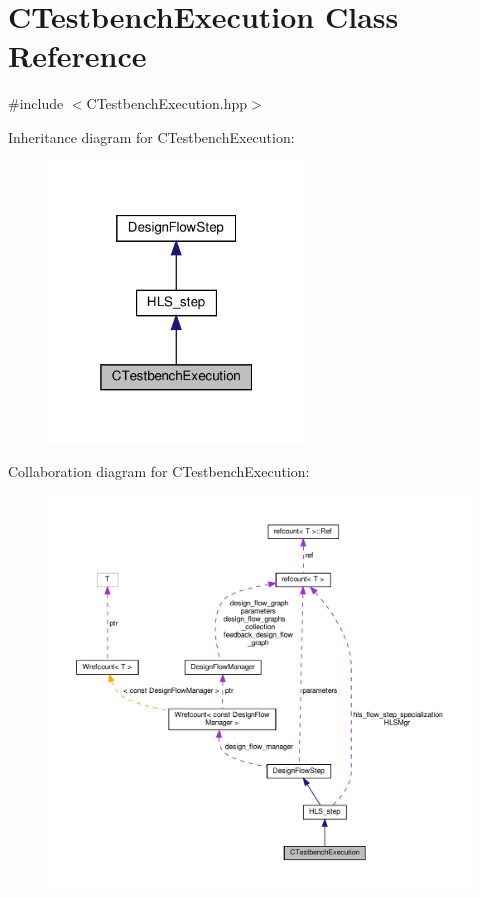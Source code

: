 \hypertarget{classCTestbenchExecution}{}\section{C\+Testbench\+Execution Class Reference}
\label{classCTestbenchExecution}


{\ttfamily \#include $<$C\+Testbench\+Execution.\+hpp$>$}



Inheritance diagram for C\+Testbench\+Execution\+:
\nopagebreak
\begin{figure}[H]
\begin{center}
\leavevmode
\includegraphics[width=193pt]{d3/d3c/classCTestbenchExecution__inherit__graph}
\end{center}
\end{figure}


Collaboration diagram for C\+Testbench\+Execution\+:
\nopagebreak
\begin{figure}[H]
\begin{center}
\leavevmode
\includegraphics[width=350pt]{d8/d1f/classCTestbenchExecution__coll__graph}
\end{center}
\end{figure}
